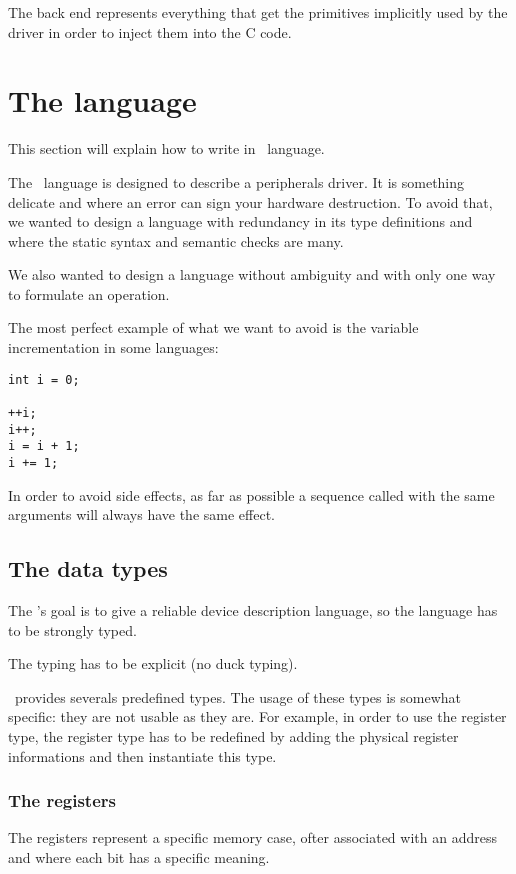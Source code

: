 \documentclass[american]{rtxreport}
\begin{document}
The back end represents everything that get the primitives implicitly used by the driver in order to
inject them into the C code.

\chapter{The language}

This section will explain how to write in \rtx\ language.

The \rtx\ language is designed to describe a peripherals driver.
It is something delicate and where an error can sign your hardware destruction.
To avoid that, we wanted to design a language with redundancy in its type definitions and
where the static syntax and semantic checks are many.

We also wanted to design a language without ambiguity and with only one way to formulate an operation.

The most perfect example of what we want to avoid is the variable incrementation in some languages:
\lstset{language=C++}
\begin{lstlisting}
int i = 0;

++i;
i++;
i = i + 1;
i += 1;
\end{lstlisting}

\lstset{language=rathaxes}

In order to avoid side effects, as far as possible a sequence called with the same arguments will always have
the same effect.

\section{The data types}

The \rtx's goal is to give a reliable device description language, so the language has to be
strongly typed.

The typing has to be explicit (no duck typing).

\rtx\ provides severals predefined types. The usage of these types is
somewhat specific: they are not usable as they are. For example,
in order to use the register type, the register type has to be redefined 
by adding the physical register informations and then instantiate this type.


\subsection{The registers}

The registers represent a specific memory case, ofter associated with an address
and where each bit has a specific meaning.
\end{document}
